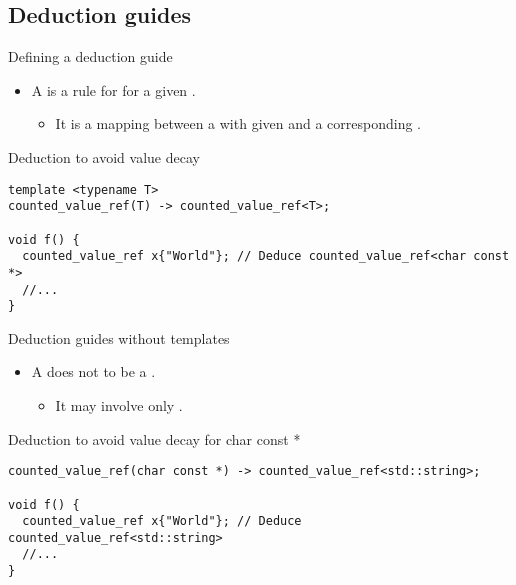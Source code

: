 \subsection{Deduction guides}

\begin{frame}[t,fragile]{Defining a deduction guide}
\begin{itemize}
  \item A  is a rule for  
        for a given .
    \begin{itemize}
      \item It is a mapping between a  with given 
             and a corresponding .
    \end{itemize}
\end{itemize}

\begin{block}{Deduction to avoid value decay}
\begin{lstlisting}
template <typename T>
counted_value_ref(T) -> counted_value_ref<T>;

void f() {
  counted_value_ref x{"World"}; // Deduce counted_value_ref<char const *>
  //...
}
\end{lstlisting}
\end{block}
\end{frame}

\begin{frame}[t,fragile]{Deduction guides without templates}
\begin{itemize}
  \item A  does not to be a .
    \begin{itemize}
      \item It may involve only .
    \end{itemize}
\end{itemize}

\begin{block}{Deduction to avoid value decay for char const *}
\begin{lstlisting}
counted_value_ref(char const *) -> counted_value_ref<std::string>;

void f() {
  counted_value_ref x{"World"}; // Deduce counted_value_ref<std::string>
  //...
}
\end{lstlisting}
\end{block}
\end{frame}
